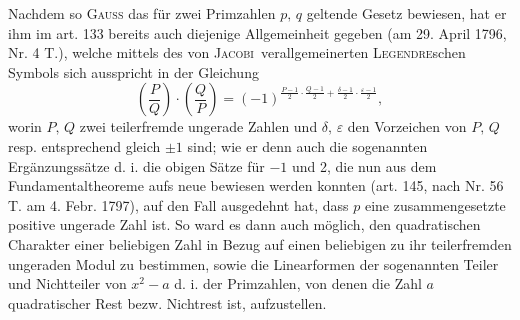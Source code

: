 Nachdem so \textsc{Gauss} das für zwei Primzahlen \(p,\,q\) geltende Gesetz bewiesen, hat er ihm im art. 133 bereits auch diejenige Allgemeinheit gegeben (am 29. April 1796, Nr. 4 T.), welche mittels des von \textsc{Jacobi}\begingroup\renewcommand{\thefootnote}{*)}\footnotemark\renewcommand{\thefootnote}{***)}\endgroup\ verallgemeinerten \textsc{Legendre}schen Symbols sich ausspricht in der Gleichung
\[
\left(\frac{P}{Q}\right)\cdot\left(\frac{Q}{P}\right)=(-1)^{\frac{P-1}{2}\cdot\frac{Q-1}{2}+\frac{\delta-1}{2}\cdot\frac{\varepsilon-1}{2}},
\]
worin \(P,\,Q\) zwei teilerfremde ungerade Zahlen und \(\delta,\,\varepsilon\) den Vorzeichen von \(P,\,Q\) resp. entsprechend gleich \(\pm1\) sind; wie er denn auch die sogenannten Ergänzungssätze d. i. die obigen Sätze für \(-1\) und 2, die nun aus dem Fundamentaltheoreme aufs neue bewiesen werden konnten (art. 145, nach Nr. 56 T. am 4. Febr. 1797), auf den Fall ausgedehnt hat, dass \(p\) eine zusammengesetzte positive ungerade Zahl ist. So ward es dann auch möglich, den quadratischen Charakter einer beliebigen Zahl in Bezug auf einen beliebigen zu ihr teilerfremden ungeraden Modul zu bestimmen, sowie die Linearformen der sogenannten Teiler und Nichtteiler von \(x^2-a\) d. i. der Primzahlen, von denen die Zahl \(a\) quadratischer Rest bezw. Nichtrest ist, aufzustellen.

